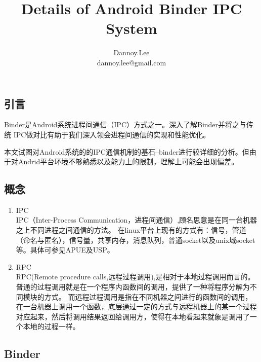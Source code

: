 \documentclass[a4paper,11pt]{article}
\author{Dannoy.Lee \\
    dannoy.lee@gmail.com
    }
\title{Details of Android Binder IPC System}
\begin{document}


\begin{CJK*}{UTF8}{gbsn}
\maketitle

\tableofcontents
\newpage

\section{引言}
Binder是Android系统进程间通信（IPC）方式之一。深入了解Binder并将之与传统 IPC做对比有助于我们深入领会进程间通信的实现和性能优化。 

本文试图对Android系统的的IPC通信机制的基石--binder进行较详细的分析。但由于对Andrid平台环境不够熟悉以及能力上的限制，理解上可能会出现偏差。
    \subsection{概念}
    \begin{enumerate}
        \item IPC \\
        IPC（Inter-Process Communication，进程间通信）,顾名思意是在同一台机器之上不同进程之间通信的方法。
        在linux平台上现有的方式有：信号，管道（命名与匿名），信号量，共享内存，消息队列，普通socket以及unix域socket等。具体可参见APUE及USP。
        \item RPC \\
        RPC(Remote procedure calls,远程过程调用),是相对于本地过程调用而言的。普通的过程调用就是在一个程序内函数间的调用，提供了一种将程序分解为不同模块的方式。
        而远程过程调用是指在不同机器之间进行的函数间的调用，在一台机器上调用一个函数，底层通过一定的方式与远程机器上的某一个过程对应起来，然后将调用结果返回给调用方，使得在本地看起来就象是调用了一个本地的过程一样。
    \end{enumerate}
    \subsection{Binder}


\end{CJK*}
\end{document}
